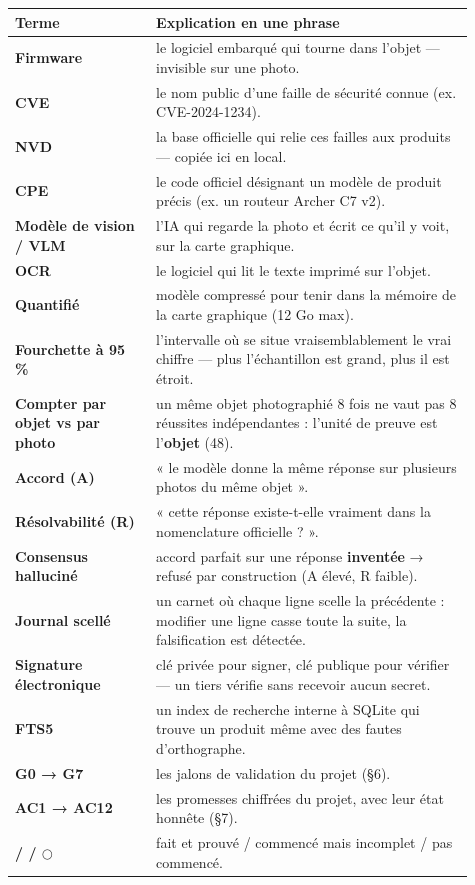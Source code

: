 \documentclass[11pt,a4paper]{article}
\newcommand{\fait}{\textcolor{green!45!black}{\ding{51}}}      %
\newcommand{\encours}{\textcolor{blue!65!black}{\ding{46}}}   %
\newcommand{\afaire}{\textcolor{orange!85!black}{$\bigcirc$}}  %
\begin{document}
\begin{longtable}{|p{0.281\linewidth}|p{0.630\linewidth}|}
\hline
\textbf{Terme} & \textbf{Explication en une phrase} \\ \hline
\endhead
\textbf{Firmware} & le logiciel embarqué qui tourne dans l'objet — invisible sur une photo. \\ \hline
\textbf{CVE} & le nom public d'une faille de sécurité connue (ex. CVE-2024-1234). \\ \hline
\textbf{NVD} & la base officielle qui relie ces failles aux produits — copiée ici en local. \\ \hline
\textbf{CPE} & le code officiel désignant un modèle de produit précis (ex. un routeur Archer C7 v2). \\ \hline
\textbf{Modèle de vision / VLM} & l'IA qui regarde la photo et écrit ce qu'il y voit, sur la carte graphique. \\ \hline
\textbf{OCR} & le logiciel qui lit le texte imprimé sur l'objet. \\ \hline
\textbf{Quantifié} & modèle compressé pour tenir dans la mémoire de la carte graphique (12 Go max). \\ \hline
\textbf{Fourchette à 95 \%} & l'intervalle où se situe vraisemblablement le vrai chiffre — plus l'échantillon est grand, plus il est étroit. \\ \hline
\textbf{Compter par objet vs par photo} & un même objet photographié 8 fois ne vaut pas 8 réussites indépendantes : l'unité de preuve est l'\textbf{objet} (48). \\ \hline
\textbf{Accord (A)} & « le modèle donne la même réponse sur plusieurs photos du même objet ». \\ \hline
\textbf{Résolvabilité (R)} & « cette réponse existe-t-elle vraiment dans la nomenclature officielle ? ». \\ \hline
\textbf{Consensus halluciné} & accord parfait sur une réponse \textbf{inventée} → refusé par construction (A élevé, R faible). \\ \hline
\textbf{Journal scellé} & un carnet où chaque ligne scelle la précédente : modifier une ligne casse toute la suite, la falsification est détectée. \\ \hline
\textbf{Signature électronique} & clé privée pour signer, clé publique pour vérifier — un tiers vérifie sans recevoir aucun secret. \\ \hline
\textbf{FTS5} & un index de recherche interne à SQLite qui trouve un produit même avec des fautes d'orthographe. \\ \hline
\textbf{G0 → G7} & les jalons de validation du projet (§6). \\ \hline
\textbf{AC1 → AC12} & les promesses chiffrées du projet, avec leur état honnête (§7). \\ \hline
\textbf{\fait / \encours / \afaire} & fait et prouvé / commencé mais incomplet / pas commencé. \\ \hline
\end{longtable}
\end{document}

